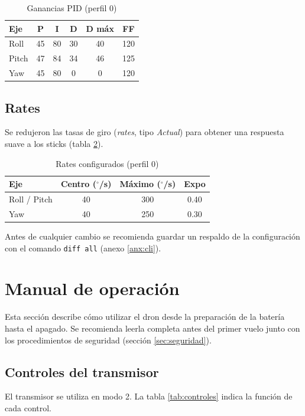 \documentclass[11pt,letterpaper]{article}
\begin{document}
\begin{table}[!h]
\centering
\caption{Ganancias PID (perfil 0)}
\label{tab:pid}
\begin{tabular}{@{}lccccc@{}}
\toprule
\textbf{Eje} & \textbf{P} & \textbf{I} & \textbf{D} & \textbf{D máx} & \textbf{FF} \\
\midrule
Roll  & 45 & 80 & 30 & 40 & 120 \\
Pitch & 47 & 84 & 34 & 46 & 125 \\
Yaw   & 45 & 80 & 0  & 0  & 120 \\
\bottomrule
\end{tabular}
\end{table}

\subsection{Rates}
Se redujeron las tasas de giro (\textit{rates}, tipo \textit{Actual}) para obtener una respuesta suave a los sticks (tabla \ref{tab:rates}).

\begin{table}[!h]
\centering
\caption{Rates configurados (perfil 0)}
\label{tab:rates}
\begin{tabular}{@{}lccc@{}}
\toprule
\textbf{Eje} & \textbf{Centro ($^{\circ}$/s)} & \textbf{Máximo ($^{\circ}$/s)} & \textbf{Expo} \\
\midrule
Roll / Pitch & 40 & 300 & 0.40 \\
Yaw          & 40 & 250 & 0.30 \\
\bottomrule
\end{tabular}
\end{table}

Antes de cualquier cambio se recomienda guardar un respaldo de la configuración con el comando \texttt{diff all} (anexo \ref{anx:cli}).

\newpage

\section{Manual de operación}
\label{sec:manual}
Esta sección describe cómo utilizar el dron desde la preparación de la batería hasta el apagado. Se recomienda leerla completa antes del primer vuelo junto con los procedimientos de seguridad (sección \ref{sec:seguridad}).

\subsection{Controles del transmisor}
El transmisor se utiliza en modo 2. La tabla \ref{tab:controles} indica la función de cada control.
\end{document}
